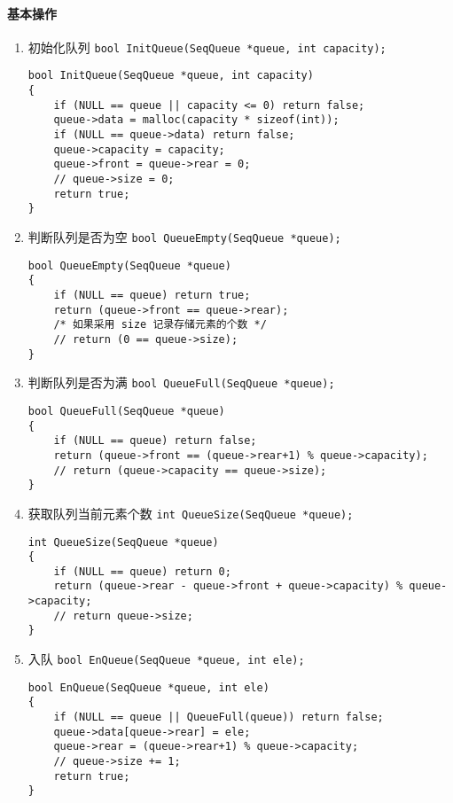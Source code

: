 \documentclass{ctexart}
\begin{document}
\paragraph{基本操作}
\begin{enumerate}
\item 初始化队列 \texttt{bool InitQueue(SeqQueue *queue, int capacity);}
\begin{verbatim}
bool InitQueue(SeqQueue *queue, int capacity)
{
    if (NULL == queue || capacity <= 0) return false;
    queue->data = malloc(capacity * sizeof(int));
    if (NULL == queue->data) return false;
    queue->capacity = capacity;
    queue->front = queue->rear = 0;
    // queue->size = 0;
    return true;
}
\end{verbatim}

\item 判断队列是否为空 \texttt{bool QueueEmpty(SeqQueue *queue);}
\begin{verbatim}
bool QueueEmpty(SeqQueue *queue)
{
    if (NULL == queue) return true;
    return (queue->front == queue->rear);
    /* 如果采用 size 记录存储元素的个数 */
    // return (0 == queue->size);
}
\end{verbatim}

\item 判断队列是否为满 \texttt{bool QueueFull(SeqQueue *queue);}
\begin{verbatim}
bool QueueFull(SeqQueue *queue)
{
    if (NULL == queue) return false;
    return (queue->front == (queue->rear+1) % queue->capacity);
    // return (queue->capacity == queue->size);
}
\end{verbatim}

\item 获取队列当前元素个数 \texttt{int QueueSize(SeqQueue *queue);}
\begin{verbatim}
int QueueSize(SeqQueue *queue)
{
    if (NULL == queue) return 0;
    return (queue->rear - queue->front + queue->capacity) % queue->capacity;
    // return queue->size;
}
\end{verbatim}

\item 入队 \texttt{bool EnQueue(SeqQueue *queue, int ele);}
\begin{verbatim}
bool EnQueue(SeqQueue *queue, int ele)
{
    if (NULL == queue || QueueFull(queue)) return false;
    queue->data[queue->rear] = ele;
    queue->rear = (queue->rear+1) % queue->capacity;
    // queue->size += 1;
    return true;
}
\end{verbatim}


\end{enumerate}
\end{document}

